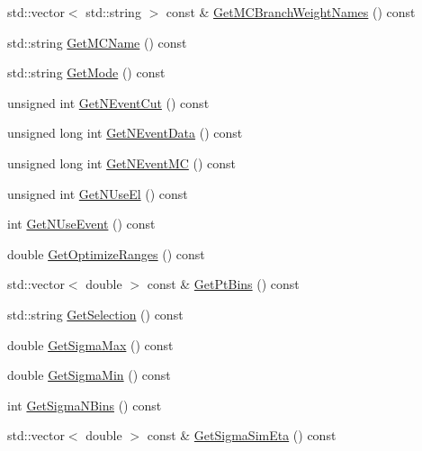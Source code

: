 \begin{DoxyCompactItemize}
\item 
std\+::vector$<$ std\+::string $>$ const \& \hyperlink{classTemplateMethod_1_1Setting_a08ea3cc0669a1747dc037f813e89ee4e}{Get\+M\+C\+Branch\+Weight\+Names} () const 
\item 
std\+::string \hyperlink{classTemplateMethod_1_1Setting_a5108a44ce8dfe9c73f3ed3084924b778}{Get\+M\+C\+Name} () const 
\item 
std\+::string \hyperlink{classTemplateMethod_1_1Setting_a9d7f24f7dfaa0c71ae0465c9436bf83f}{Get\+Mode} () const 
\item 
unsigned int \hyperlink{classTemplateMethod_1_1Setting_a2896758ed5372647cab9b549735dde09}{Get\+N\+Event\+Cut} () const 
\item 
unsigned long int \hyperlink{classTemplateMethod_1_1Setting_a0d25096ef5bd518b27f1f34759509f37}{Get\+N\+Event\+Data} () const 
\item 
unsigned long int \hyperlink{classTemplateMethod_1_1Setting_a04f619c64c85d3fdb25fa5e1e9ba68db}{Get\+N\+Event\+M\+C} () const 
\item 
unsigned int \hyperlink{classTemplateMethod_1_1Setting_ad9b9edbc200900e42cf80cb81e9504af}{Get\+N\+Use\+El} () const 
\item 
int \hyperlink{classTemplateMethod_1_1Setting_a4e5521751ccadda5881f463c87f22a31}{Get\+N\+Use\+Event} () const 
\item 
double \hyperlink{classTemplateMethod_1_1Setting_a1886b7bc1705b2f0a477d3ac6216b36b}{Get\+Optimize\+Ranges} () const 
\item 
std\+::vector$<$ double $>$ const \& \hyperlink{classTemplateMethod_1_1Setting_a57af1841fd377db1f95f1e2dcfed3080}{Get\+Pt\+Bins} () const 
\item 
std\+::string \hyperlink{classTemplateMethod_1_1Setting_a3751a054f7c3abccc97c99caf4431eca}{Get\+Selection} () const 
\item 
double \hyperlink{classTemplateMethod_1_1Setting_aadebbffe51827c59405f671a39f8e81d}{Get\+Sigma\+Max} () const 
\item 
double \hyperlink{classTemplateMethod_1_1Setting_aa417bf2b1b514aaeaea1c20a602bc4fc}{Get\+Sigma\+Min} () const 
\item 
int \hyperlink{classTemplateMethod_1_1Setting_a1f2e3f55b362a027dcb7d1327f58d910}{Get\+Sigma\+N\+Bins} () const 
\item 
std\+::vector$<$ double $>$ const \& \hyperlink{classTemplateMethod_1_1Setting_a9d1227e526a0012909b5480f5c553813}{Get\+Sigma\+Sim\+Eta} () const 
\item 

\end{DoxyCompactItemize}
